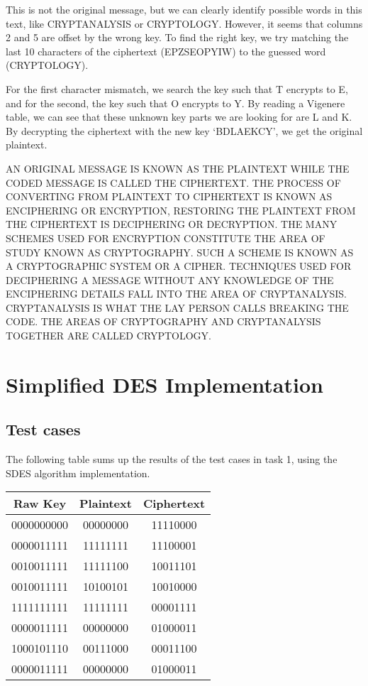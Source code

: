 \documentclass{article}
\begin{document}
This is not the original message, but we can clearly identify possible words in this text, like CRYPTANALYSIS or CRYPTOLOGY. However, it seems that columns 2 and 5 are offset by the wrong key. To find the right key, we try matching the last 10 characters of the ciphertext (EPZSEOPYIW) to the guessed word (CRYPTOLOGY). 

For the first character mismatch, we search the key such that T encrypts to E, and for the second, the key such that O encrypts to Y. By reading a Vigenere table, we can see that these unknown key parts we are looking for are L and K.
By decrypting the ciphertext with the new key `BDLAEKCY', we get the original plaintext.
\bigskip

\sloppy
AN ORIGINAL MESSAGE IS KNOWN AS THE PLAINTEXT WHILE THE CODED MESSAGE IS CALLED THE CIPHERTEXT. THE PROCESS OF CONVERTING FROM PLAINTEXT TO CIPHERTEXT IS KNOWN AS ENCIPHERING OR ENCRYPTION,  RESTORING THE PLAINTEXT FROM THE CIPHERTEXT IS DECIPHERING OR DECRYPTION. THE MANY SCHEMES USED FOR ENCRYPTION CONSTITUTE THE AREA OF STUDY KNOWN AS CRYPTOGRAPHY. SUCH A SCHEME IS KNOWN AS A CRYPTOGRAPHIC SYSTEM OR A CIPHER. TECHNIQUES USED FOR DECIPHERING A MESSAGE WITHOUT ANY KNOWLEDGE OF THE ENCIPHERING DETAILS FALL INTO THE AREA OF CRYPTANALYSIS. CRYPTANALYSIS IS WHAT THE LAY PERSON CALLS BREAKING THE CODE. THE AREAS OF CRYPTOGRAPHY AND CRYPTANALYSIS TOGETHER ARE CALLED CRYPTOLOGY.

\section{Simplified DES Implementation}

\subsection{Test cases}


The following table sums up the results of the test cases in task 1, using the SDES algorithm implementation.

\begin{center}
    \begin{tabular}{|c c c|}
        \hline
        \textbf{Raw Key} & \textbf{Plaintext} & \textbf{Ciphertext} \\
        \hline
        0000000000 & 00000000 & 11110000 \\
        0000011111 & 11111111 & 11100001 \\
        0010011111 & 11111100 & 10011101 \\
        0010011111 & 10100101 & 10010000 \\
        1111111111 & 11111111 & 00001111 \\
        0000011111 & 00000000 & 01000011 \\
        1000101110 & 00111000 & 00011100 \\
        0000011111 & 00000000 & 01000011 \\
        \hline
    \end{tabular}
\end{center}
\end{document}
